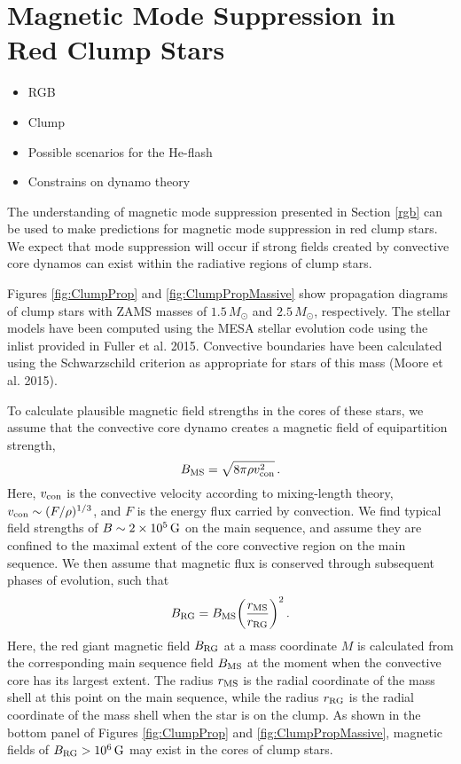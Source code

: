 \section{Magnetic Mode Suppression in Red Clump Stars}
\begin{itemize}
\item RGB 
\item Clump
\item Possible scenarios for the He-flash
\item Constrains on dynamo theory
\end{itemize}

The understanding of magnetic mode suppression presented in Section \ref{rgb} can be used to make predictions for magnetic mode suppression in red clump stars. We expect that mode suppression will occur if strong fields created by convective core dynamos can exist within the radiative regions of clump stars. 

Figures \ref{fig:ClumpProp} and \ref{fig:ClumpPropMassive} show propagation diagrams of clump stars with ZAMS masses of $1.5 \, M_\odot$ and $2.5 \, M_\odot$, respectively. The stellar models have been computed using the MESA stellar evolution code \citep{Paxton_2010} using the inlist provided in Fuller et al. 2015. Convective boundaries have been calculated using the Schwarzschild criterion as appropriate for stars of this mass (Moore et al. 2015).

To calculate plausible magnetic field strengths in the cores of these stars, we assume that the convective core dynamo creates a magnetic field of equipartition strength,
\begin{equation}
\label{eqn:Beq}
B_{\rm MS} = \sqrt{ 8 \pi \rho v_{\rm con}^2} \, .
\end{equation}
Here, $v_{\rm con}$ is the convective velocity according to mixing-length theory, $v_{\rm con} \sim (F/\rho)^{1/3}$, and $F$ is the energy flux carried by convection. We find typical field strengths of $B \sim 2 \times 10^5 \, {\rm G}$ on the main sequence, and assume they are confined to the maximal extent of the core convective region on the main sequence. We then assume that magnetic flux is conserved through subsequent phases of evolution, such that
\begin{equation}
\label{eqn:Brgb}
B_{\rm RG} = B_{\rm MS} \bigg( \frac{r_{\rm MS}}{r_{\rm RG}} \bigg)^2 \, .
\end{equation}
Here, the red giant magnetic field $B_{\rm RG}$ at a mass coordinate $M$ is calculated from the corresponding main sequence field $B_{\rm MS}$ at the moment when the convective core has its largest extent. The radius $r_{\rm MS}$ is the radial coordinate of the mass shell at this point on the main sequence, while the radius $r_{\rm RG}$ is the radial coordinate of the mass shell when the star is on the clump. As shown in the bottom panel of Figures \ref{fig:ClumpProp} and \ref{fig:ClumpPropMassive}, magnetic fields of $B_{\rm RG} > 10^6 \, {\rm G}$ may exist in the cores of clump stars. 


    